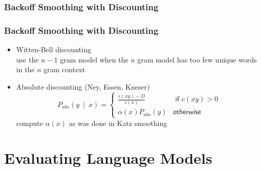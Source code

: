 \subsubsection{Backoff Smoothing with Discounting}

\begin{frame}
\frametitle{Backoff Smoothing with Discounting}
\begin{itemize}[<+->]
\item Witten-Bell discounting \\
use the $n-1$ gram model when the $n$ gram model has too few unique words \alert{in the $n$ gram context}
\item Absolute discounting (Ney, Essen, Kneser)
\[ P_{\textit{abs}}(y~\mid~x) = \left\{ 
\begin{array}{cc}
\frac{ c(xy) - D }{ c(x) } & \textsf{ if $c(xy) > 0$} \\
\alpha(x) P_{\textit{abs}} (y) & \textsf{otherwise}
\end{array}
\right. \]
compute $\alpha(x)$ as was done in Katz smoothing
\end{itemize}
\end{frame}

\section{Evaluating Language Models}
\frame{\tableofcontents[currentsection]}

